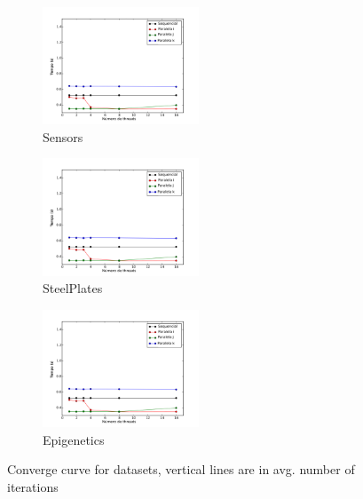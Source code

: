 \begin{figure}[H]
		\begin{subfigure}{.3\textwidth}
			\centering
			\includegraphics[height=3.5cm]{images/sensors}
			\caption{Sensors}
			\label{fig:sensors}
		\end{subfigure}
		\begin{subfigure}{.3\textwidth}
			\centering
			\includegraphics[height=3.5cm]{images/steelPlates}
			\caption{SteelPlates}
			\label{fig:steelplates}
		\end{subfigure}
		\begin{subfigure}{.3\textwidth}
			\centering
			\includegraphics[height=3.5cm]{images/epigenetics}
			\caption{Epigenetics}
			\label{fig:epigenetics}
		\end{subfigure}
		\caption{Converge curve for datasets, vertical lines are in avg. number of iterations}
		\label{fig:converge}
	\end{figure}
